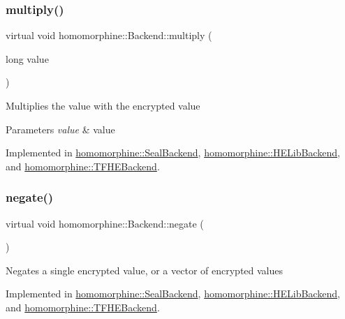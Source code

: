 \subsubsection{\texorpdfstring{multiply()}{multiply()}\hspace{0.1cm}{\footnotesize\ttfamily [2/2]}}
{\footnotesize\ttfamily virtual void homomorphine\+::\+Backend\+::multiply (\begin{DoxyParamCaption}\item[{long}]{value }\end{DoxyParamCaption})\hspace{0.3cm}{\ttfamily [pure virtual]}}

Multiplies the value with the encrypted value


\begin{DoxyParams}{Parameters}
{\em value} & value \\
\hline
\end{DoxyParams}


Implemented in \mbox{\hyperlink{classhomomorphine_1_1_seal_backend_afd8f13068d81c0038b966df4219e8033}{homomorphine\+::\+Seal\+Backend}}, \mbox{\hyperlink{classhomomorphine_1_1_h_e_lib_backend_a49d4e073eecc4759f12f60188a533835}{homomorphine\+::\+H\+E\+Lib\+Backend}}, and \mbox{\hyperlink{classhomomorphine_1_1_t_f_h_e_backend_a725473513598a847caa921baa8134ae2}{homomorphine\+::\+T\+F\+H\+E\+Backend}}.

\mbox{\label{classhomomorphine_1_1_backend_ab0064461260713ce7a9f660b5f6dc5af}} 
\subsubsection{\texorpdfstring{negate()}{negate()}}
{\footnotesize\ttfamily virtual void homomorphine\+::\+Backend\+::negate (\begin{DoxyParamCaption}{ }\end{DoxyParamCaption})\hspace{0.3cm}{\ttfamily [pure virtual]}}

Negates a single encrypted value, or a vector of encrypted values 

Implemented in \mbox{\hyperlink{classhomomorphine_1_1_seal_backend_a9064cf9822de85af9120528cef084bea}{homomorphine\+::\+Seal\+Backend}}, \mbox{\hyperlink{classhomomorphine_1_1_h_e_lib_backend_acb1ed456fa91fc1dfe878abb068f3f34}{homomorphine\+::\+H\+E\+Lib\+Backend}}, and \mbox{\hyperlink{classhomomorphine_1_1_t_f_h_e_backend_a99410beb4f8d7002b762d36fedba0d95}{homomorphine\+::\+T\+F\+H\+E\+Backend}}.

